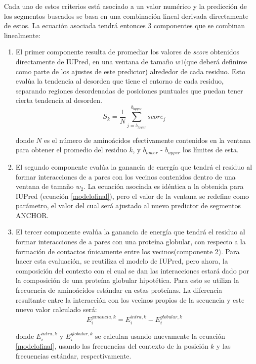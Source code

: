 Cada uno de estos criterios está asociado a un valor numérico y la predicción de los segmentos buscados se basa en una combinación lineal derivada directamente de estos.
La ecuación asociada tendrá entonces 3 componentes que se combinan linealmente:
\begin{enumerate}
 \item El primer componente resulta de promediar los valores de \textit{score} obtenidos directamente de IUPred, en una ventana de tamaño $w1$(que deberá definirse como parte de los ajustes de este predictor)  alrededor de cada residuo. 
Esto evalúa la tendencia al desorden que tiene el entorno de cada residuo, separando regiones desordenadas de posiciones puntuales que puedan tener cierta tendencia al desorden.
\begin{equation}\label{score1}
 S_k = \frac{1}{N} \sum_{j=b_{lower}}^{b_{upper}} score_j
\end{equation}

donde $N$ es el número de aminoácidos efectivamente contenidos en la ventana para obtener el promedio del residuo $k$, y $b_{lower}$ - $b_{upper}$ los límites de esta.

\item El segundo componente evalúa la ganancia de energía que tendrá el residuo al formar interacciones de a pares con los vecinos contenidos dentro de una ventana de tamaño $w_2$. 
La ecuación asociada es idéntica a la obtenida para IUPred (ecuación \ref{modelofinal}), pero el valor de la ventana se redefine como parámetro, el valor del cual será ajustado 
al nuevo predictor de segmentos ANCHOR.

\item El tercer componente evalúa la ganancia de energía que tendrá el residuo al formar interacciones de a pares con una proteína globular, 
con respecto a la formación de contactos únicamente entre los vecinos(componente 2). Para hacer esta evaluación, se reutiliza el modelo de IUPred, pero ahora, 
la composición del contexto con el cual se dan las interacciones estará dado por la composición de una proteína globular hipotética. 
Para esto se utiliza la frecuencia de aminoácidos estándar en estas proteínas.
La diferencia resultante entre la interacción con los vecinos propios de la secuencia y este nuevo valor calculado será:
\begin{equation}\label{score3}
E_i^{ganancia,k} = E_i^{intra,k} - E_i^{globular,k}
\end{equation}

donde $E_i^{intra,k}$ y $E_i^{globular,k}$ se calculan usando nuevamente la ecuación \ref{modelofinal}, usando las frecuencias del contexto de la posición $k$ y las frecuencias estándar, respectivamente.
\end{enumerate}

